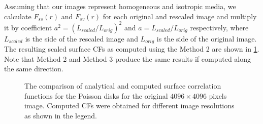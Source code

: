 \documentclass[reprint,amsmath,amssymb,aps,pre]{revtex4-1}
\begin{document}
Assuming that our images represent homogeneous and isotropic media, we calculate
$F_{ss}(r)$ and $F_{sv}(r)$ for each original and rescaled image and multiply it
by coefficient $a^2 = (L_{scaled}/L_{orig})^2$ and $a = L_{scaled}/L_{orig}$
respectively, where $L_{scaled}$ is the side of the rescaled image and
$L_{orig}$ is the side of the original image. The resulting scaled surface CFs
as computed using the Method 2 are shown in \cref{fig:scaling}. Note that
Method 2 and Method 3 produce the same results if computed along the same
direction.

\begin{figure}[ht]
  \centering
  \hfill
    \caption[]{The comparison of analytical and computed surface correlation
      functions for the Poisson disks for the original $4096 \times 4096$ pixels
      image. Computed CFs were obtained for different image resolutions as shown
      in the legend.}
    \label{fig:scaling}
\end{figure}
\end{document}
